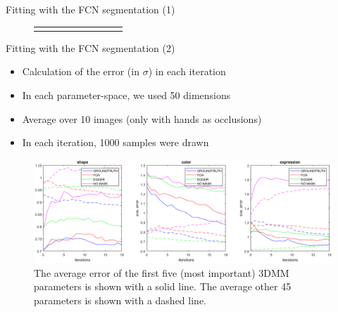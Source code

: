 \documentclass{beamer}
\begin{document}
\begin{frame}[c]{Fitting with the FCN segmentation (1)}
\begin{figure}
\begin{tabular}{m{1.3cm}|SC|SC|SC|SC}
			 &
			 &
			 \\
		\end{tabular}
	\end{figure}
\end{frame}

\begin{frame}[c]{Fitting with the FCN segmentation (2)}
	\begin{itemize}
		\item Calculation of the error (in $\sigma$) in each iteration
		\item In each parameter-space, we used 50 dimensions
		\item Average over 10 images (only with hands as occlusions)
		\item In each iteration, 1000 samples were drawn
	\end{itemize}
	\begin{figure}
		\includegraphics[width=1\textwidth]{chap3_setting1/plot_hands_setting1.png}
		\caption{The average error of the first five (most important) 3DMM parameters is shown with a solid line. The average other 45 parameters is shown with a dashed line.}
	\end{figure}
\end{frame}
\end{document}

